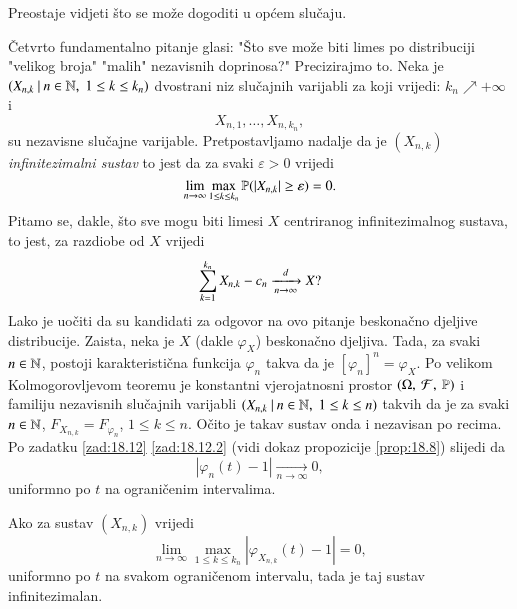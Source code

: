 Preostaje vidjeti \v sto se mo\v ze dogoditi u op\' cem slu\v caju.

\v Cetvrto fundamentalno pitanje glasi: "\v Sto sve mo\v ze biti limes po distribuciji "velikog broja" "malih" nezavisnih doprinosa?"
Precizirajmo to.
Neka je $({X_{n, k}} \: | \: {n \in \mathbb{N}, \; 1 \leq k \leq k_n})$ dvostrani niz slu\v cajnih varijabli za koji vrijedi: $k_n \nearrow +\infty$ i
\begin{equation*}
    X_{n, 1}, \ldots, X_{n, k_n},
\end{equation*}
su nezavisne slu\v cajne varijable.
Pretpostavljamo nadalje da je $(X_{n, k})$ \emph{infinitezimalni sustav} to jest da za svaki $\varepsilon > 0$ vrijedi
\begin{equation}    \label{jed:20.12}
    \lim\limits_{n \to \infty} \max\limits_{1 \leq k \leq k_n} \mathbb{P} (|X_{n, k}| \geq \varepsilon) = 0.
\end{equation}
Pitamo se, dakle, \v sto sve mogu biti limesi $X$ centriranog infinitezimalnog sustava, to jest, za razdiobe od $X$ vrijedi
\begin{equation}    \label{jed:20.13}
    \sum\limits_{k = 1}^{k_n} X_{n, k} - c_n \xrightarrow[n \to \infty]{d} X?
\end{equation}
Lako je uo\v citi da su kandidati za odgovor na ovo pitanje beskona\v cno djeljive distribucije.
Zaista, neka je $X$ (dakle $\varphi_X$) beskona\v cno djeljiva.
Tada, za svaki $n \in \mathbb{N}$, postoji karakteristi\v cna funkcija $\varphi_n$ takva da je $[\varphi_n]^n = \varphi_X$.
Po velikom Kolmogorovljevom teoremu je konstantni vjerojatnosni prostor $(\Omega, \: \mathcal{F}, \: \mathbb{P})$ i familiju nezavisnih slu\v cajnih varijabli $({X_{n, k}} \: | \: {n \in \mathbb{N}, \; 1 \leq k \leq n})$ takvih da je za svaki $n \in \mathbb{N}$, $F_{X_{n, k}} = F_{\varphi_n}$, $1 \leq k \leq n$.
O\v cito je takav sustav onda i nezavisan po recima.
Po zadatku \ref{zad:18.12} \ref{zad:18.12.2} (vidi dokaz propozicije \ref{prop:18.8}) slijedi da
\begin{equation*}
    |\varphi_n (t) - 1| \xrightarrow[n \to \infty]{} 0,
\end{equation*}
uniformno po $t$ na ograni\v cenim intervalima.

\begin{zad} \label{zad:20.14}
    Ako za sustav $(X_{n, k})$ vrijedi
    \begin{equation}
        \lim\limits_{n \to \infty} \max\limits_{1 \leq k \leq k_n} |\varphi_{X_{n, k}}(t) - 1| = 0,
    \end{equation}
    uniformno po $t$ na svakom ograni\v cenom intervalu, tada je taj sustav infinitezimalan.
\end{zad}

